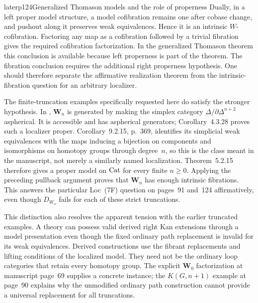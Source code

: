 \begin{dcomment}{later}{p124}{Generalized Thomason models and the role of properness}
Dually, in a left proper model structure, a model cofibration remains one after cobase change, and pushout along it preserves weak equivalences. Hence it is an intrinsic $W$-cofibration. Factoring any map as a cofibration followed by a trivial fibration gives the required cofibration factorization. In the generalized Thomason theorem this conclusion is available because left properness is part of the theorem. The fibration conclusion requires the additional right properness hypothesis. One should therefore separate the affirmative realization theorem from the intrinsic-fibration question for an arbitrary localizer.

The finite-truncation examples specifically requested here do satisfy the stronger hypothesis. In \citet[Section~9.2.1, p.~364]{Cisinski2006}, $\mathbf W_n$ is generated by making the simplex category $\Delta/\partial\Delta^{n+2}$ aspherical. It is accessible and has aspherical generators; Corollary~4.3.28 proves such a localizer proper. Corollary~9.2.15, p.~369, identifies its simplicial weak equivalences with the maps inducing a bijection on components and isomorphisms on homotopy groups through degree~$n$, so this is the class meant in the manuscript, not merely a similarly named localization. Theorem~5.2.15 therefore gives a proper model on $\mathrm{Cat}$ for every finite $n\geq0$. Applying the preceding pullback argument proves that $\mathbf W_n$ has enough intrinsic fibrations. This answers the particular Loc~(7F) question on pages~91 and~124 affirmatively, even though $D_{W_\omega}$ fails for each of these strict truncations.

This distinction also resolves the apparent tension with the earlier truncated examples. A theory can possess valid derived right Kan extensions through a model presentation even though the fixed ordinary path replacement is invalid for its weak equivalences. Derived constructions use the fibrant replacements and lifting conditions of the localized model. They need not be the ordinary loop categories that retain every homotopy group. The explicit $\mathbf W_0$ factorization at manuscript page~69 supplies a concrete instance; the $K(G,n+1)$ example at page~90 explains why the unmodified ordinary path construction cannot provide a universal replacement for all truncations.
\end{dcomment}
